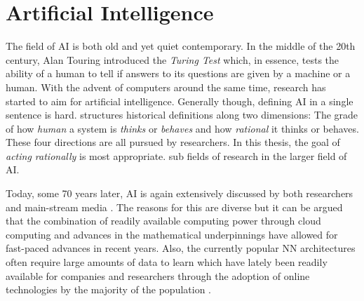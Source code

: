 


\section{Artificial Intelligence}%
\label{sec:artificial_intelligence}


The field of \ac{AI} is both old and yet quiet contemporary. In the middle of the 20th century, Alan Touring introduced
the \emph{Turing Test} which, in essence, tests the ability of a human to tell if answers to its questions are given by
a machine or a human. With the advent of computers around the same time, research has started to aim for artificial
intelligence. Generally though, defining \ac{AI} in a single sentence is hard.  \citet{russell2016artificial} structures
historical definitions along two dimensions: The grade of how \emph{human} a system is \emph{thinks} or \emph{behaves}
and how \emph{rational} it thinks or behaves. These four directions are all pursued by researchers. In this thesis, the
goal of \emph{acting rationally} is most appropriate.  sub fields of research in the larger field of \ac{AI}.


Today, some 70 years later, \ac{AI} is again extensively discussed by both researchers and main-stream media
\citep[p.24ff.]{russell2016artificial, arulkumaran2017brief}. The reasons for this are diverse but it can be argued that
the combination of readily available computing power through cloud computing and advances in the mathematical
underpinnings have allowed for fast-paced advances in recent years. Also, the currently popular \acf {NN}
architectures often require large amounts of data to learn which have lately been readily available for companies and
researchers through the adoption of online technologies by the majority of the population
\citep[p.27]{russell2016artificial}.
